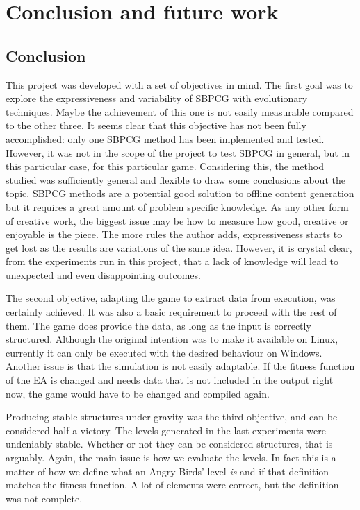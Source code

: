 \chapter{Conclusion and future work}\label{ch:Conclusion}
\section{Conclusion}

This project was developed with a set of objectives in mind. The first goal was to explore the expressiveness and variability of \acf{SBPCG} with evolutionary techniques. Maybe the achievement of this one is not easily measurable compared to the other three. It seems clear that this objective has not been fully accomplished: only one \acs{SBPCG} method has been implemented and tested. However, it was not in the scope of the project to test \acs{SBPCG} in general, but in this particular case, for this particular game. Considering this, the method studied was sufficiently general and flexible to draw some conclusions about the topic. \acs{SBPCG} methods are a potential good solution to offline content generation but it requires a great amount of problem specific knowledge. As any other form of creative work, the biggest issue may be how to measure how good, creative or enjoyable is the piece. The more rules the author adds, expressiveness starts to get lost as the results are variations of the same idea. However, it is crystal clear, from the experiments run in this project, that a lack of knowledge  will lead to unexpected and even disappointing outcomes.

The second objective, adapting the game to extract data from execution, was certainly achieved. It was also a basic requirement to proceed with the rest of them. The game does provide the data, as long as the input is correctly structured. Although the original intention was to make it available on Linux, currently it can only be executed with the desired behaviour on Windows. Another issue is that the simulation is not easily adaptable. If the fitness function of the \acs{EA} is changed and needs data that is not included in the output right now, the game would have to be changed and compiled again.

Producing stable structures under gravity was the third objective, and can be considered half a victory. The levels generated in the last experiments were undeniably stable. Whether or not they can be considered structures, that is arguably. Again, the main issue is how we evaluate the levels. In fact this is a matter of how we define what an Angry Birds' level \textit{is} and if that definition matches the fitness function. A lot of elements were correct, but the definition was not complete.

